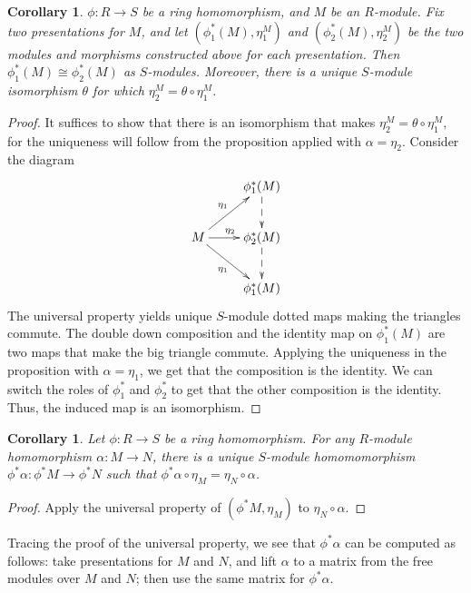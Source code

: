 \documentclass{amsart}[12pt]
\numberwithin{equation}{section}
\theoremstyle{plain} %
\newtheorem{cor}[equation]{Corollary}
\theoremstyle{definition}
\theoremstyle{remark}
\begin{document}
\begin{cor}
 $\phi:R\to S$ be a ring homomorphism, and $M$ be an $R$-module. Fix two presentations for $M$, and let $(\phi_1^*(M),\eta^M_1)$ and $(\phi^*_2(M), \eta^M_2)$ be the two modules and morphisms constructed above for each presentation. Then $\phi^*_1(M)\cong \phi^*_2(M)$ as $S$-modules. Moreover, there is a unique $S$-module isomorphism $\theta$ for which $\eta^M_2 = \theta \circ \eta^M_1$.
\end{cor}
\begin{proof}
It suffices to show that there is an isomorphism that makes $\eta^M_2 = \theta \circ \eta^M_1$, for the uniqueness will follow from the proposition applied with $\alpha=\eta_2$.
Consider the diagram
\[ \xymatrix{ & \phi^*_1(M) \ar@{-->}[d]\\
M \ar[ur]^{\eta_1} \ar[r]^{\eta_2} \ar[dr]_{\eta_1} & \phi^*_2(M)\ar@{-->}[d] \\
& \phi^*_1(M)}\]
The universal property yields unique $S$-module dotted maps making the triangles commute. The double down composition and the identity map on $\phi^*_1(M)$ are two maps that make the big triangle commute. Applying the uniqueness in the proposition with $\alpha=\eta_1$, we get that the composition is the identity. We can switch the roles of $\phi^*_1$ and $\phi^*_2$ to get that the other composition is the identity. Thus, the induced map is an isomorphism.
\end{proof}

\begin{cor}
Let $\phi:R\to S$ be a ring homomorphism. For any $R$-module homomorphism $\alpha:M\to N$, there is a unique $S$-module homomomorphism $\phi^*\alpha:\phi^*M \to \phi^*N$ such that $\phi^*\alpha \circ \eta_M = \eta_N \circ \alpha$.
\end{cor}
\begin{proof} 
Apply the universal property of $(\phi^*M, \eta_M)$ to $\eta_N \circ \alpha$.
\end{proof}

Tracing the proof of the universal property, we see that $\phi^*\alpha$ can be computed as follows: take presentations for $M$ and $N$, and
lift $\alpha$ to a matrix from the free modules over $M$ and $N$; then use the same matrix for $\phi^*\alpha$.
\end{document}

